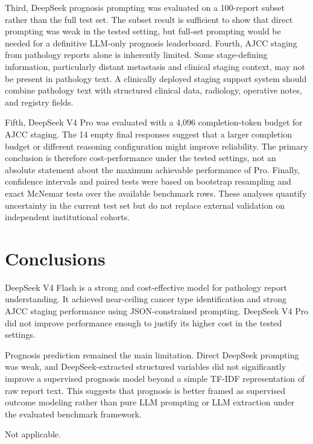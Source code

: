 \documentclass[pdflatex,sn-vancouver-num]{sn-jnl}
\begin{document}
Third, DeepSeek prognosis prompting was evaluated on a 100-report subset rather than the full test set. The subset result is sufficient to show that direct prompting was weak in the tested setting, but full-set prompting would be needed for a definitive LLM-only prognosis leaderboard. Fourth, AJCC staging from pathology reports alone is inherently limited. Some stage-defining information, particularly distant metastasis and clinical staging context, may not be present in pathology text. A clinically deployed staging support system should combine pathology text with structured clinical data, radiology, operative notes, and registry fields.

Fifth, DeepSeek V4 Pro was evaluated with a 4,096 completion-token budget for AJCC staging. The 14 empty final responses suggest that a larger completion budget or different reasoning configuration might improve reliability. The primary conclusion is therefore cost-performance under the tested settings, not an absolute statement about the maximum achievable performance of Pro. Finally, confidence intervals and paired tests were based on bootstrap resampling and exact McNemar tests over the available benchmark rows. These analyses quantify uncertainty in the current test set but do not replace external validation on independent institutional cohorts.

\section{Conclusions}\label{sec:conclusions}

DeepSeek V4 Flash is a strong and cost-effective model for pathology report understanding. It achieved near-ceiling cancer type identification and strong AJCC staging performance using JSON-constrained prompting. DeepSeek V4 Pro did not improve performance enough to justify its higher cost in the tested settings.

Prognosis prediction remained the main limitation. Direct DeepSeek prompting was weak, and DeepSeek-extracted structured variables did not significantly improve a supervised prognosis model beyond a simple TF-IDF representation of raw report text. This suggests that prognosis is better framed as supervised outcome modeling rather than pure LLM prompting or LLM extraction under the evaluated benchmark framework.

\backmatter


Not applicable.
\end{document}
